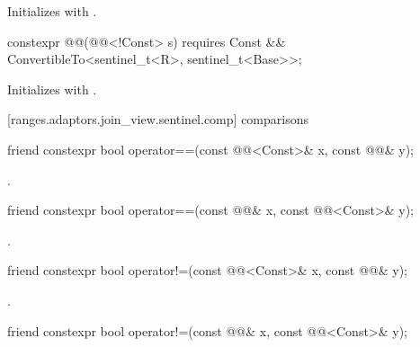 \begin{itemdescr}
\pnum
\effects Initializes  with .
\end{itemdescr}

\begin{itemdecl}
constexpr @@(@@<!Const> s) requires Const &&
  ConvertibleTo<sentinel_t<R>, sentinel_t<Base>>;
\end{itemdecl}

\begin{itemdescr}
\pnum
\effects Initializes  with .
\end{itemdescr}

[ranges.adaptors.join_view.sentinel.comp]{ comparisons}

\begin{itemdecl}
friend constexpr bool operator==(const @@<Const>& x, const @@& y);
\end{itemdecl}

\begin{itemdescr}
\pnum
\returns {}.
\end{itemdescr}

\begin{itemdecl}
friend constexpr bool operator==(const @@& x, const @@<Const>& y);
\end{itemdecl}

\begin{itemdescr}
\pnum
\returns {}.
\end{itemdescr}

\begin{itemdecl}
friend constexpr bool operator!=(const @@<Const>& x, const @@& y);
\end{itemdecl}

\begin{itemdescr}
\pnum
\returns {}.
\end{itemdescr}

\begin{itemdecl}
friend constexpr bool operator!=(const @@& x, const @@<Const>& y);
\end{itemdecl}

